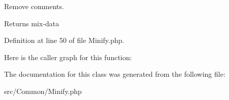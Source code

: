 Remove comments.

\begin{DoxyReturn}{Returns}
mix-\/data 
\end{DoxyReturn}


Definition at line 50 of file Minify.\+php.

Here is the caller graph for this function\+:


The documentation for this class was generated from the following file\+:\begin{DoxyCompactItemize}
\item 
src/\+Common/Minify.\+php\end{DoxyCompactItemize}
